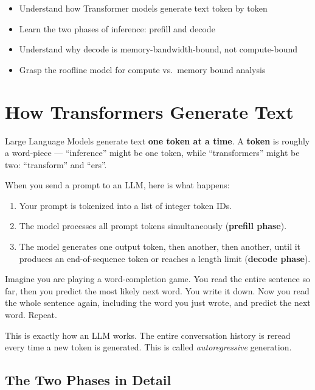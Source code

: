 \documentclass[10pt, oneside, openany]{book}
\newcommand{\analogybox}[2]{\begin{tcolorbox}[analogystyle, title={Analogy: #1}]#2\end{tcolorbox}}
\newenvironment{learningobjectives}
  {\begin{tcolorbox}[enhanced, breakable,
    colback={rgb,255:red,232;green,240;blue,255},
    colframe=NavyBlue, boxrule=1.5pt, arc=4pt,
    title={\bfseries Learning Objectives},
    fonttitle=\bfseries\color{white},
    attach boxed title to top left={yshift=-2mm, xshift=5mm},
    boxed title style={colback=NavyBlue, arc=2pt}]
  \begin{itemize}[leftmargin=1.5em, itemsep=2pt]}
  {\end{itemize}\end{tcolorbox}}
\newcommand{\keyterm}[1]{\textbf{\color{AccentOrange}#1}}
\begin{document}
\begin{learningobjectives}
  \item Understand how Transformer models generate text token by token
  \item Learn the two phases of inference: prefill and decode
  \item Understand why decode is memory-bandwidth-bound, not compute-bound
  \item Grasp the roofline model for compute vs.\ memory bound analysis
\end{learningobjectives}

\section{How Transformers Generate Text}

Large Language Models generate text \textbf{one token at a time}.  A
\keyterm{token} is roughly a word-piece --- ``inference'' might be
one token, while ``transformers'' might be two: ``transform'' and ``ers''.

When you send a prompt to an LLM, here is what happens:

\begin{enumerate}
  \item Your prompt is tokenized into a list of integer token IDs.
  \item The model processes all prompt tokens simultaneously (\textbf{prefill phase}).
  \item The model generates one output token, then another, then another, until
        it produces an end-of-sequence token or reaches a length limit
        (\textbf{decode phase}).
\end{enumerate}

\analogybox{The Sentence Completion Game}{
Imagine you are playing a word-completion game.  You read the entire sentence so
far, then you predict the most likely next word.  You write it down.  Now you read
the whole sentence again, including the word you just wrote, and predict the next
word.  Repeat.

This is exactly how an LLM works.  The entire conversation history is reread every
time a new token is generated.  This is called \textit{autoregressive} generation.
}

\subsection{The Two Phases in Detail}
\end{document}
